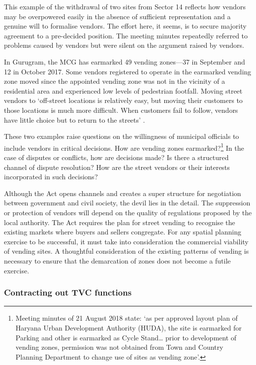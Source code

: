\documentclass[a4paper, 12pt, twoside]{article}
\begin{document}
{{This example of the withdrawal of two sites from Sector 14 reflects how vendors may be overpowered easily in the absence of sufficient representation and a genuine will to formalise vendors. The effort here, it seems, is to secure majority agreement to a pre-decided position. The meeting minutes repeatedly referred to problems caused by vendors but were silent on the argument raised by vendors.

In Gurugram, the MCG has earmarked 49 vending zones—37 in September and 12 in October 2017. Some vendors registered to operate in the earmarked vending zone moved since the appointed vending zone was not in the vicinity of a residential area and experienced low levels of pedestrian footfall. Moving street vendors to `off-street locations is relatively easy, but moving their customers to those locations is much more difficult. When customers fail to follow, vendors have little choice but to return to the streets' \parencite{bromleypaper}.

These two examples raise questions on the willingness of municipal officials to include vendors in critical decisions. How are vending zones earmarked?\footnote{Meeting minutes of 21 August 2018 state: `as per approved layout plan of Haryana Urban Development Authority (HUDA), the site is earmarked for Parking and other is earmarked as Cycle Stand… prior to development of vending zones, permission was not obtained from Town and Country Planning Department to change use of sites as vending zone'.} In the case of disputes or conflicts, how are decisions made? Is there a structured channel of dispute resolution? How are the street vendors or their interests incorporated in such decisions?





Although the Act opens channels and creates a super structure for negotiation between government and civil society, the devil lies in the detail. The suppression or protection of vendors will depend on the quality of regulations proposed by the local authority. The Act requires the plan for street vending to recognise the existing markets where buyers and sellers congregate. For any spatial planning exercise to be successful, it must take into consideration the commercial viability of vending sites. A thoughtful consideration of the existing patterns of vending is necessary to ensure that the demarcation of zones does not become a futile exercise.


\subsubsection*{Contracting out TVC functions}

}}
\end{document}
